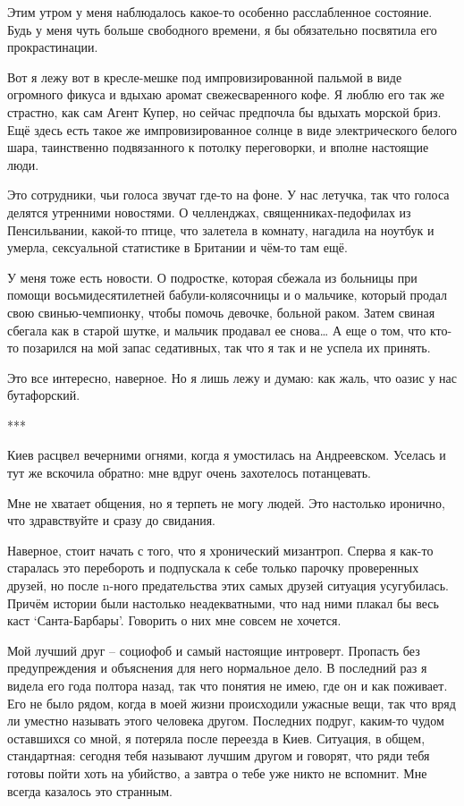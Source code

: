\documentclass[
]{book}
\begin{document}
Этим утром у меня наблюдалось какое-то особенно расслабленное состояние. Будь у меня чуть больше свободного времени, я бы обязательно посвятила его прокрастинации.

Вот я лежу вот в кресле-мешке под импровизированной пальмой в виде огромного фикуса и вдыхаю аромат свежесваренного кофе. Я люблю его так же страстно, как сам Агент Купер, но сейчас предпочла бы вдыхать морской бриз. Ещё здесь есть такое же импровизированное солнце в виде электрического белого шара, таинственно подвязанного к потолку переговорки, и вполне настоящие люди.

Это сотрудники, чьи голоса звучат где-то на фоне. У нас летучка, так что голоса делятся утренними новостями. О челленджах, священниках-педофилах из Пенсильвании, какой-то птице, что залетела в комнату, нагадила на ноутбук и умерла, сексуальной статистике в Британии и чём-то там ещё.

У меня тоже есть новости. О подростке, которая сбежала из больницы при помощи восьмидесятилетней бабули-колясочницы и о мальчике, который продал свою свинью-чемпионку, чтобы помочь девочке, больной раком. Затем свиная сбегала как в старой шутке, и мальчик продавал ее снова\ldots{} А еще о том, что кто-то позарился на мой запас седативных, так что я так и не успела их принять.

Это все интересно, наверное. Но я лишь лежу и думаю: как жаль, что оазис у нас бутафорский.

***

Киев расцвел вечерними огнями, когда я умостилась на Андреевском. Уселась и тут же вскочила обратно: мне вдруг очень захотелось потанцевать.

Мне не хватает общения, но я терпеть не могу людей. Это настолько иронично, что здравствуйте и сразу до свидания.

Наверное, стоит начать с того, что я хронический мизантроп. Сперва я как-то старалась это перебороть и подпускала к себе только парочку проверенных друзей, но после n-ного предательства этих самых друзей ситуация усугубилась. Причём истории были настолько неадекватными, что над ними плакал бы весь каст `Санта-Барбары'. Говорить о них мне совсем не хочется.

Мой лучший друг -- социофоб и самый настоящие интроверт. Пропасть без предупреждения и объяснения для него нормальное дело. В последний раз я видела его года полтора назад, так что понятия не имею, где он и как поживает. Его не было рядом, когда в моей жизни происходили ужасные вещи, так что вряд ли уместно называть этого человека другом. Последних подруг, каким-то чудом оставшихся со мной, я потеряла после переезда в Киев. Ситуация, в общем, стандартная: сегодня тебя называют лучшим другом и говорят, что ряди тебя готовы пойти хоть на убийство, а завтра о тебе уже никто не вспомнит. Мне всегда казалось это странным.
\end{document}
